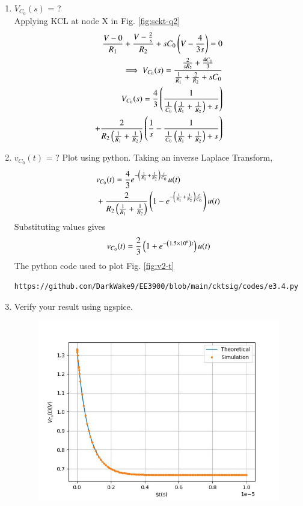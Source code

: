 \documentclass[journal,12pt,twocolumn]{IEEEtran}
\renewcommand\thesection{\arabic{section}}
\begin{document}
\begin{enumerate}[label=\arabic*.,ref=\thesection.\theenumi]
\item $V_{C_0}(s)$ = ?
\solution\\
Applying KCL at node X in Fig. \ref{fig:sckt-q2}
\begin{align}
	\frac{V - 0}{R_1} + \frac{V - \frac{2}{s}}{R_2} + sC_0\left(V - \frac{4}{3s}\right) = 0 \\
	\implies V_{C_0}(s) = \frac{\frac{2}{sR_2} + \frac{4C_0}{3}}{\frac{1}{R_1} + \frac{2}{R_2} + sC_0}\\
	\label{eq:v2-s}
	V_{C_0}(s) = \frac{4}{3}\left(\frac{1}{\frac{1}{C_0}\left(\frac{1}{R_1} + \frac{1}{R_2}\right)+s}\right) \nonumber \\
	+ \frac{2}{R_2\left(\frac{1}{R_1} +\frac{1}{R_2}\right)}\left(\frac{1}{s} - \frac{1}{\frac{1}{C_0}\left(\frac{1}{R_1} + \frac{1}{R_2}\right) + s}\right)
\end{align}
\item $v_{C_0}(t)$ = ? Plot using python.
Taking an inverse Laplace Transform,
\begin{align}
	&v_{C_0}(t) = \frac{4}{3}e^{-\left(\frac{1}{R_1} + \frac{1}{R_2}\right)\frac{t}{C_0}}u(t) \nonumber \\ 
	&+ \frac{2}{R_2\left(\frac{1}{R_1}+\frac{1}{R_2}\right)}\left(1 - e^{-\left(\frac{1}{R_1} + \frac{1}{R_2}\right)\frac{t}{C_0}}\right)u(t)
\end{align}
Substituting values gives
\begin{align}
	v_{C_0}(t) = \frac{2}{3}\left(1 +e^{-\left(1.5 \times 10^6\right)t}\right)u(t)
	\label{eq:v2-t}
\end{align}
The python code used to plot Fig. \ref{fig:v2-t}
\begin{lstlisting}
https://github.com/DarkWake9/EE3900/blob/main/cktsig/codes/e3.4.py
\end{lstlisting}
\item Verify your result using ngspice.\\
\solution
\begin{figure}[!htb]
	\includegraphics[width=\columnwidth]{./figs/e3.4.jpg}

\end{figure}
\end{enumerate}
\end{document}
